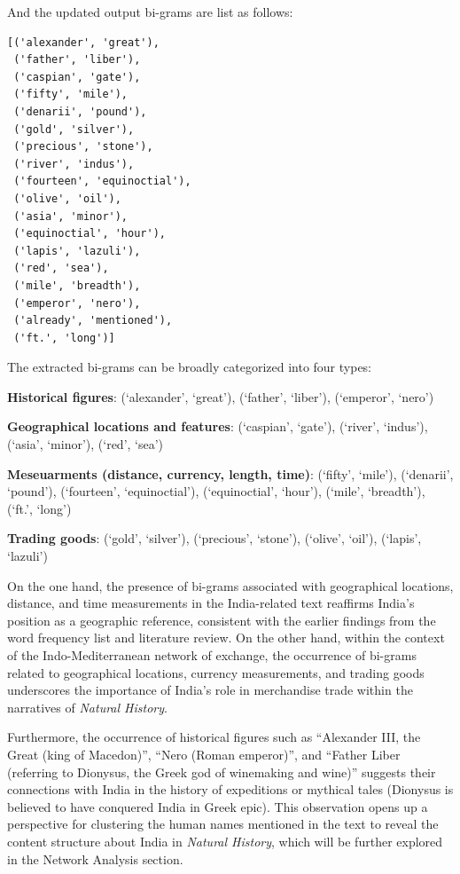 \documentclass[
  12pt,
]{article}
\begin{document}
And the updated output bi-grams are list as follows:

\begin{verbatim}
[('alexander', 'great'),
 ('father', 'liber'),
 ('caspian', 'gate'),
 ('fifty', 'mile'),
 ('denarii', 'pound'),
 ('gold', 'silver'),
 ('precious', 'stone'),
 ('river', 'indus'),
 ('fourteen', 'equinoctial'),
 ('olive', 'oil'),
 ('asia', 'minor'),
 ('equinoctial', 'hour'),
 ('lapis', 'lazuli'),
 ('red', 'sea'),
 ('mile', 'breadth'),
 ('emperor', 'nero'),
 ('already', 'mentioned'),
 ('ft.', 'long')]
\end{verbatim}

The extracted bi-grams can be broadly categorized into four types:

\textbf{Historical figures}: (`alexander', `great'), (`father',
`liber'), (`emperor', `nero')

\textbf{Geographical locations and features}: (`caspian', `gate'),
(`river', `indus'), (`asia', `minor'), (`red', `sea')

\textbf{Meseuarments (distance, currency, length, time)}: (`fifty',
`mile'), (`denarii', `pound'), (`fourteen', `equinoctial'),
(`equinoctial', `hour'), (`mile', `breadth'), (`ft.', `long')

\textbf{Trading goods}: (`gold', `silver'), (`precious', `stone'),
(`olive', `oil'), (`lapis', `lazuli')

On the one hand, the presence of bi-grams associated with geographical
locations, distance, and time measurements in the India-related text
reaffirms India's position as a geographic reference, consistent with
the earlier findings from the word frequency list and literature review.
On the other hand, within the context of the Indo-Mediterranean network
of exchange, the occurrence of bi-grams related to geographical
locations, currency measurements, and trading goods underscores the
importance of India's role in merchandise trade within the narratives of
\emph{Natural History}.

Furthermore, the occurrence of historical figures such as ``Alexander
III, the Great (king of Macedon)'', ``Nero (Roman emperor)'', and
``Father Liber (referring to Dionysus, the Greek god of winemaking and
wine)'' suggests their connections with India in the history of
expeditions or mythical tales (Dionysus is believed to have conquered
India in Greek epic). This observation opens up a perspective for
clustering the human names mentioned in the text to reveal the content
structure about India in \emph{Natural History}, which will be further
explored in the Network Analysis section.
\end{document}

